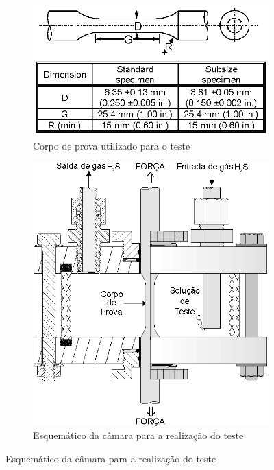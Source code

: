 \begin{figure}
    \caption{Estruturas de teste}
    \begin{subfigure}{.5\textwidth}
      \centering
      \includegraphics[width=.8\linewidth]{imgs/met/corpo_de_prova}
      \caption{Corpo de prova utilizado para o teste}
      \label{fig:corpo_de_prova}
    \end{subfigure}%
    \begin{subfigure}{.5\textwidth}
      \centering
      \includegraphics[width=.8\linewidth]{imgs/met/estrutura_de_teste}
      \caption{Esquemático da câmara para a realização do teste}
      \label{fig:sfig2}
    \end{subfigure}
    \label{fig:estrutura_de_teste}
    \end{figure}

